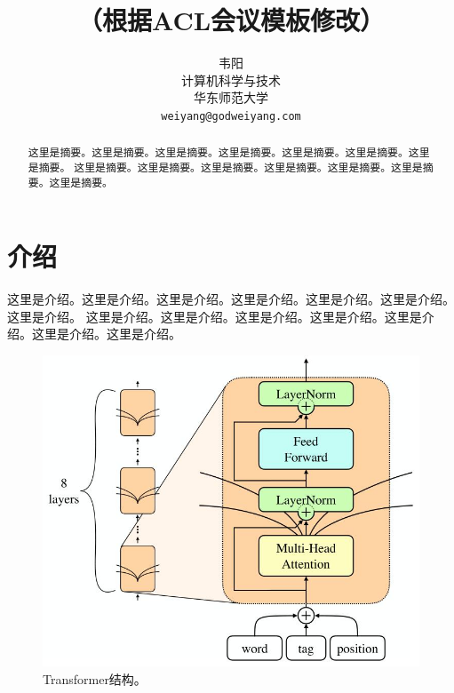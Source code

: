 \documentclass[11pt,a4paper]{article}
\title{\LaTeX双栏中文模板（根据ACL会议模板修改）}
\author{韦阳\\
  计算机科学与技术\\
  华东师范大学\\
  \texttt{weiyang@godweiyang.com} \\}
\date{}
\begin{document}
\maketitle
\begin{abstract}
    这里是摘要。这里是摘要。这里是摘要。这里是摘要。这里是摘要。这里是摘要。这里是摘要。
    这里是摘要。这里是摘要。这里是摘要。这里是摘要。这里是摘要。这里是摘要。这里是摘要。
\end{abstract}

\section{介绍}
\label{Sec:Introduction}
这里是介绍。这里是介绍。这里是介绍。这里是介绍。这里是介绍。这里是介绍。这里是介绍。
这里是介绍。这里是介绍。这里是介绍。这里是介绍。这里是介绍。这里是介绍。这里是介绍。

\begin{figure}[htbp]
    \centering
    \includegraphics[width=\linewidth]{images/multi_headed_attention.jpg}
    \caption{Transformer结构。}
    \label{Fig:multi_headed_attention}
\end{figure}
\end{document}
